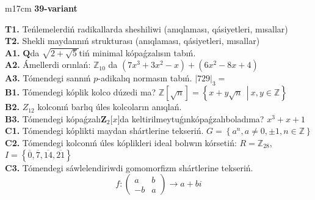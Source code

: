 \documentclass{article}
\begin{document}
\begin{tabular}{m{17cm}}
\textbf{39-variant}
\newline

\textbf{T1.} Teńlemelerdiń radikallarda sheshiliwi (anıqlaması, qásiyetleri, mısallar) \\
\textbf{T2.} Shekli maydannıń strukturası (anıqlaması, qásiyetleri, mısallar) \\
\textbf{A1.} \(\mathbf{Q}\)da \(\sqrt{2 + \sqrt{5}}\)tiń minimal kópaǵzalısın tabıń. \\
\textbf{A2.} Ámellerdi orınlań: \(\mathbb{Z}_{10}\) da \(\left( 7x^{3} + 3x^{2} - x \right) + \left( 6x^{2} - 8x + 4 \right)\) \\
\textbf{A3.} Tómendegi sannıń \(p\)-adikalıq normasın tabıń. \(|729|_{3} =\) \\
\textbf{B1.} Tómendegi kóplik kolco dúzedi ma? \(\mathbb{Z}\left\lbrack \sqrt{n} \right\rbrack = \left\{ x + y\sqrt{n}\ \ \left| \right.\ x,y \in \mathbb{Z} \right\}\) \\
\textbf{B2.} \(Z_{12}\) kolconıń barlıq úles kolcoların anıqlań. \\
\textbf{B3.} Tómendegi kópaǵzalı\(\mathbf{Z}_{2}\lbrack x\rbrack\)da keltirilmeytuǵınkópaǵzalıboladıma? \(x^{3} + x + 1\) \\
\textbf{C1.} Tómendegi kóplikti maydan shártlerine tekseriń. \(G = \left\{ a^{n},a \neq 0, \pm 1,n \in \mathbb{Z} \right\}\) \\
\textbf{C2.} Tómendegi kolconıń úles kóplikleri ideal bolıwın kórsetiń:
\(R = \mathbb{Z}_{28}\), \(I = \left\{ \overline{0},\overline{7},\overline{14},\overline{21} \right\}\) \\
\textbf{C3.} Tómendegi sáwlelendiriwdi gomomorfizm shártlerine tekseriń.
\[f:\begin{pmatrix}
a & b \\
 - b & a
\end{pmatrix} \rightarrow a + bi\] \\

\end{tabular}
\vspace{1cm}
\end{document}
